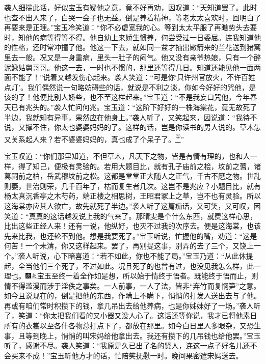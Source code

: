 袭人细揣此话，好似宝玉有疑他之意，竟不好再劝，因叹道：``天知道罢了。此时也查不出人来了，白哭一会子也无益。倒是养着精神，等老太太喜欢时，回明白了再要来是正理。''宝玉冷笑道：``你不必虚宽我的心。等到太太平服了再瞧势头去要时，知他的病等得等不得。他自幼上来娇生惯养，何尝受过一日委屈。连我知道他的性格，还时常冲撞了他。他这一下去，就如同一盆才抽出嫩箭来的兰花送到猪窝里去一般。况又是一身重病，里头一肚子的闷气。他又没有亲爷热娘，只有一个醉泥鳅姑舅哥哥。他这一去，一时也不惯的，那里还等得几日。知道还能见他一面两面不能了！''说着又越发伤心起来。袭人笑道：``可是你`只许州官放火，不许百姓点灯'。我们偶然说一句略妨碍些的话，就说是不利之谈，你如今好好的咒他，是该的了！他便比别人娇些，也不至这样起来。''宝玉道：``不是我妄口咒他，今年春天已有兆头的。''袭人忙问何兆。宝玉道：``这阶下好好的一株海棠花，竟无故死了半边，我就知有异事，果然应在他身上。''袭人听了，又笑起来，因说道：``我待不说，又撑不住，你太也婆婆妈妈的了。这样的话，岂是你读书的男人说的。草木怎又关系起人来？{若不婆婆妈妈的，真也成了个呆子了。}\href{../Text/part0081_split_000.html\#lnkback_1_a}{\textsuperscript{①}}''

宝玉叹道：``你们那里知道，不但草木，凡天下之物，皆是有情有理的，也和人一样，得了知己，便极有灵验的。若用大题目比，就有孔子庙前之桧，坟前之蓍，诸葛祠前之柏，岳武穆坟前之松。这都是堂堂正大随人之正气，千古不磨之物。世乱则萎，世治则荣，几千百年了，枯而复生者几次。这岂不是兆应？小题目比，就有杨太真沉香亭之木芍药，端正楼之相思树，王昭君冢上之草，岂不也有灵验。所以这海棠亦应其人欲亡，故先就死了半边。''袭人听了这篇痴话，又可笑，又可叹，因笑道：``真真的这话越发说上我的气来了。那晴雯是个什么东西，就费这样心思，比出这些正经人来！还有一说，他纵好，也灭不过我的次序去。便是这海棠，也该先来比我，也还轮不到他。想是我要死了。''宝玉听说，忙握他的嘴，劝道：``这是何苦！一个未清，你又这样起来。罢了，再别提这事，别弄的去了三个，又饶上一个。''袭人听说，心下暗喜道：``若不如此，你也不能了局。''宝玉乃道：``从此休提起，全当他们三个死了，不过如此。况且死了的也曾有过，也没见我怎么样，此一理也。{\includegraphics[width=3mm]{../Images/00004}\includegraphics[width=3mm]{../Images/00012}\footnotesize \kaishu 宝玉至终一着全作如是想，所以始于情终于悟者。既能终于悟而止，则情不得滥漫而涉于淫佚之事矣。一人前事，一人了法，皆非``弃竹而复悯笋''之意。}如今且说现在的，倒是把他的东西，作瞒上不瞒下，悄悄的打发人送出去与了他。再或有咱们常时积攒下的钱，拿几吊出去给他养病，也是你姊妹好了一场。''袭人听了，笑道：``你太把我们看的又小器又没人心了。这话还等你说，我才已将他素日所有的衣裳以至各什各物总打点下了，都放在那里。如今白日里人多眼杂，又恐生事，且等到晚上，悄悄的叫宋妈给他拿出去。我还有攒下的几吊钱也给他罢。''宝玉听了，感谢不尽。袭人笑道：``我原是久已出了名的贤人，连这一点子好名儿还不会买来不成！''宝玉听他方才的话，忙陪笑抚慰一时。晚间果密遣宋妈送去。

